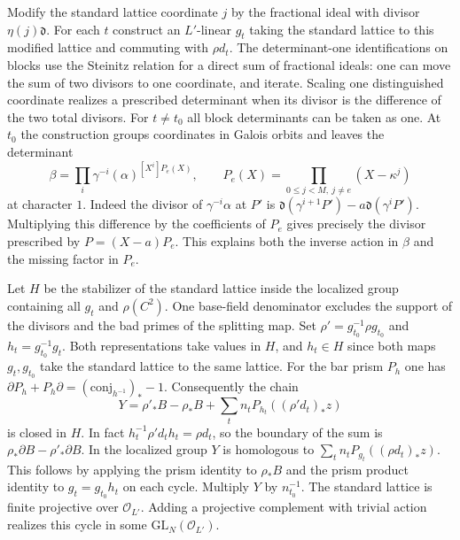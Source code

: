 Modify the standard lattice coordinate $j$ by the fractional ideal
with divisor $\eta(j)\mathfrak d$. For each $t$ construct an
$L'$-linear $g_t$ taking the standard lattice to this modified lattice
and commuting with $\rho d_t$. The determinant-one identifications on
blocks use the Steinitz relation for a direct sum of fractional ideals:
one can move the sum of two divisors to one coordinate, and iterate.
Scaling one distinguished coordinate realizes a prescribed determinant
when its divisor is the difference of the two total divisors.
For $t\ne t_0$ all block determinants can be taken as one. At $t_0$
the construction groups coordinates in Galois orbits and leaves the
determinant
\[
 \beta=\prod_i\gamma^{-i}(\alpha)^{[X^i]P_e(X)},\qquad
 P_e(X)=\prod_{0\le j<M,\ j\ne e}(X-\kappa^j)
\]
at character $1$. Indeed the divisor of $\gamma^{-i}\alpha$ at $P'$
is $\mathfrak d(\gamma^{i+1}P')-a\mathfrak d(\gamma^iP')$.
Multiplying this difference by the coefficients of $P_e$ gives
precisely the divisor prescribed by $P=(X-a)P_e$. This explains
both the inverse action in $\beta$ and the missing factor in $P_e$.

Let $H$ be the stabilizer of the standard lattice inside the localized
group containing all $g_t$ and $\rho(C^2)$. One base-field denominator
excludes the support of the divisors and the bad primes of the splitting
map. Set $\rho'=g_{t_0}^{-1}\rho g_{t_0}$ and $h_t=g_{t_0}^{-1}g_t$.
Both representations take values in $H$, and $h_t\in H$ since both
maps $g_t,g_{t_0}$ take the standard lattice to the same lattice.
For the bar prism $P_h$ one has
$\partial P_h+P_h\partial=(\mathrm{conj}_{h^{-1}})_*-1$.
Consequently the chain
\[
 Y=\rho'_*B-\rho_*B+\sum_t n_t P_{h_t}((\rho'd_t)_*z)
\]
is closed in $H$. In fact $h_t^{-1}\rho'd_th_t=\rho d_t$, so the
boundary of the sum is $\rho_*\partial B-\rho'_*\partial B$.
In the localized group $Y$ is homologous to
$\sum_t n_t P_{g_t}((\rho d_t)_*z)$. This follows by applying the
prism identity to $\rho_*B$ and the prism product identity to
$g_t=g_{t_0}h_t$ on each cycle. Multiply $Y$ by $n_{t_0}^{-1}$.
The standard lattice is finite projective over $\mathcal O_{L'}$.
Adding a projective complement with trivial action realizes this cycle
in some $\mathrm{GL}_N(\mathcal O_{L'})$.

